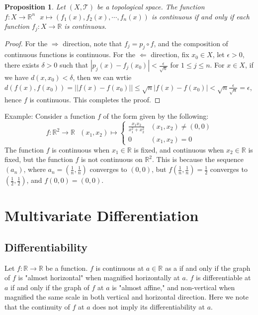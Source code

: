 \documentclass[15pt]{book}
\theoremstyle{break}
\theoremstyle{break}
\newtheorem{prop}[lem]{Proposition}
\newcommand{\R}{\mathbb{R}}
\newcommand{\T}{\mathcal{T}}
\newcommand{\example}{\color{green}Example: \color{black}}
\begin{document}
\begin{prop}
Let $(X,\T)$ be a topological space. The function $f: X\to \R^n \ \ \ x\mapsto (f_1(x),f_2(x),\cdots, f_n(x))$ is continuous if and only if each function $f_j:X \to \R$ is continuous.
\end{prop}
\begin{proof}
For the $\Rightarrow$ direction, note that $f_j = p_j \circ f$, and the composition of continuous functions is continuous. For the $\Leftarrow$ direction, fix $x_0 \in X$, let $\epsilon>0$, there exists $\delta >0 $ such that $|p_j(x)-f_j(x_0)|< \frac{\epsilon}{\sqrt{n}}$ for $1\leq j \leq n$. For $x \in X$, if we have $d(x,x_0) < \delta$, then we can wrtie $d(f(x),f(x_0)) = ||f(x)-f(x_0)|| \leq \sqrt{n}|f(x)-f(x_0)| < \sqrt{n}\frac{\epsilon}{\sqrt{n}} = \epsilon$, hence $f$ is continuous. This completes the proof.
\end{proof}

\example Consider a function $f$ of the form given by the following: $$f: \R^2 \to \R \ \ \ (x_1,x_2) \mapsto \begin{cases} \frac{x_1x_2}{x_1^2+x_2^2} & (x_1,x_2) \neq (0,0)\\ 0 & (x_1,x_2) = 0 
\end{cases}$$
The function $f$ is continuous when $x_1 \in \R$ is fixed, and continuous when $x_2\in \R$ is fixed, but the function $f$ is not continuous on $\R^2$. This is because the sequence $(a_n)$, where $a_n = (\frac{1}{n},\frac{1}{n})$ converges to $(0,0)$, but $f(\frac{1}{n},\frac{1}{n}) = \frac{1}{2}$ converges to $(\frac{1}{2},\frac{1}{2})$, and $f(0,0) = (0,0)$. 

\chapter{Multivariate Differentiation}
\setcounter{section}{4}
\section[Differentiability]{\color{red} Differentiability \color{black}}
Let $f:\R \to \R$ be a function. $f$ is continuous at $a\in \R$ as a if and only if the graph of $f$ is "almost horizontal" when magnified horizontally at $a$. $f$ is differentiable at $a$ if and only if the graph of $f$ at $a$ is "almost affine," and non-vertical when magnified the same scale in both vertical and horizontal direction. Here we note that the continuity of $f$ at $a$ does not imply its differentiability at $a$.\\
\end{document}
